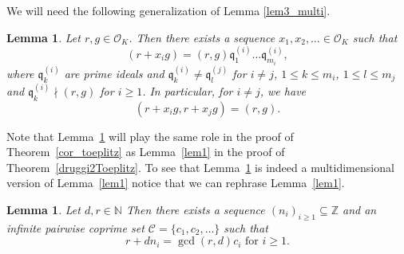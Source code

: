 \documentclass[leqno,a4paper,12pt]{article}
\newtheorem{Lemma}[Th]{Lemma}
\theoremstyle{definition}
\newcommand{\divides}{\mid}
\newcommand{\ndivides}{\nmid}
\newcommand{\Z}{{\mathbb{Z}}}
\newcommand{\N}{{\mathbb{N}}}
\newcommand{\OK}{\mathcal{O}_K}
\begin{document}
%
We will need the following generalization of Lemma \ref{lem3_multi}.
\begin{Lemma}\label{lem4_multi}
Let $r,g\in\OK$. Then there exists a sequence $x_1,x_2,\ldots\in\OK$ such that
\[
(r+x_ig)=(r,g)\mathfrak{q}_1^{(i)}\ldots\mathfrak{q}_{m_i}^{(i)},
\]
where $\mathfrak{q}_k^{(i)}$ are prime ideals and $\mathfrak{q}_k^{(i)}\neq\mathfrak{q}_l^{(j)}$ for $i\neq j$, $1\leq k\leq m_i$, $1\leq l\leq m_j$ and $\mathfrak{q}_k^{(i)}\ndivides(r,g)$ for $i\geq1$. In particular, for $i\neq j$, we have
\[(r+x_ig,r+x_jg)=(r,g).\]
\end{Lemma}
Note that Lemma~\ref{lem4_multi} will play the same role in the proof of Theorem~\ref{cor_toeplitz} as Lemma~\ref{lem1} in the proof of Theorem~\ref{druggi2Toeplitz}. To see that Lemma~\ref{lem4_multi} is indeed a multidimensional version of Lemma~\ref{lem1} notice that we can rephrase Lemma~\ref{lem1}.
\begin{Lemma}
Let $d,r\in\N$ Then there exists a sequence $(n_i)_{i\geq 1}\subseteq \Z$ and an infinite pairwise coprime set $\mathcal{C}=\{c_1,c_2,\dots\}$ such that
\[
r+dn_i=\gcd(r,d)c_i \text{ for }i\geq 1.
\]
\end{Lemma}
\end{document}

